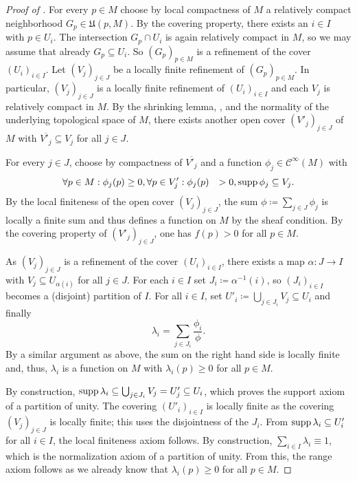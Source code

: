 \begin{proof}[Proof of ]
  For every $p \in M$ choose by local compactness of $M$ a relatively compact neighborhood $G_p
  \in \mathfrak U(p, M)$. By the covering property, there exists an $i \in I$ with
  $p \in U_i$. The intersection $G_p \cap U_i$ is again relatively compact in $M$,
  so we may assume that already $G_p \subseteq U_i$. So  
  $(G_p)_{p \in M}$ is a refinement of the cover $(U_i)_{i \in I}$.
  Let $(V_j)_{j \in J}$ be a locally finite refinement of $(G_p)_{p \in M}$. In
  particular, $(V_j)_{j \in J}$ is a locally finite refinement of $(U_i)_{i \in I}$
  and each $V_j$ is relatively compact in $M$. By the shrinking lemma, ,
  and the normality of the underlying topological space of $M$, there exists
  another open cover $(V'_j)_{j \in J}$ of $M$ with
  $\overline{V'_j} \subseteq V_j$ for all $j \in J$.
  
  For every $j \in J$, choose by compactness of $\overline{V'_j}$ and
   a function
  $\phi_j \in \mathcal C^\infty(M)$ with
  \begin{align*}
    \forall p \in M: \phi_j(p) & \ge 0,
    \forall p \in V'_j: \phi_j(p) & > 0,
    \operatorname{supp} \phi_j \subseteq V_j.
  \end{align*}
  By the local finiteness of the open cover $(V_j)_{j \in J}$, the sum
  $\phi \coloneqq \sum_{j \in J} \phi_j$ is locally a finite sum and thus defines
  a function on $M$ by the sheaf condition. By the covering property of
  $(V'_j)_{j \in J}$,
  one has $f(p) > 0$ for all $p \in M$.
  
  As $(V_j)_{j \in J}$ is a refinement of the cover $(U_i)_{i \in I}$, there exists a
  map $\alpha\colon J \to I$ with $V_j \subseteq U_{\alpha(i)}$ for all $j \in J$.
  For each $i \in I$ set $J_i \coloneqq \alpha^{-1}(i)$, so $(J_i)_{i \in I}$ becomes
  a (disjoint) partition of $I$. For all $i \in I$, set
  $U'_i \coloneqq \bigcup_{j \in J_i} V_j \subseteq U_i$ and finally
  \[
    \lambda_i = \sum_{j \in J_i} \frac{\phi_i}{\phi}.
  \]
  By a similar argument as above, the sum on the right hand side is locally finite
  and, thus, $\lambda_i$ is a function on $M$ with $\lambda_i(p) \ge 0$ for all
  $p \in M$.
  
  By construction, $\operatorname{supp} \lambda_i \subseteq \bigcup_{j \in J_i} V_j = U'_j \subseteq
  U_i$, which proves the support axiom of a partition of unity. The covering
  $(U'_i)_{i \in I}$ is locally finite as the covering $(V_j)_{j \in J}$ is locally
  finite; this uses the disjointness of the $J_i$. From $\operatorname{supp} \lambda_i \subseteq U'_i$
  for all $i \in I$, the local finiteness axiom follows. By construction,
  $\sum_{i \in I} \lambda_i \equiv 1$, which is the normalization axiom of a
  partition of unity.
  From this, the range axiom follows as we already know that $\lambda_i(p) \ge 0$
  for all $p \in M$.
\end{proof}

